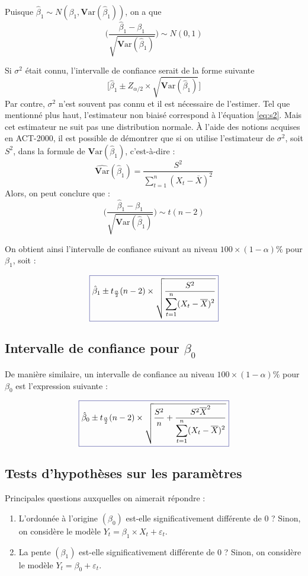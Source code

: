 \documentclass[11pt,french]{report}
\newcommand{\Var}{\mathrm{\textbf{V}ar}}
\begin{document}
\bigskip
Puisque $ \hat{\beta}_1 \sim N(\beta_1, \Var(\hat{\beta}_1))$, on a que 
$$
\Bigg(\frac{\hat{\beta}_1 - \beta_1}{\sqrt{\Var(\hat{\beta}_1)}}\Bigg) \sim N(0,1)
$$

Si $\sigma^2$ était connu, l'intervalle de confiance serait de la forme suivante 
$$
\bigg[\hat{\beta}_1\pm Z_{\alpha/2} \times \sqrt{\Var(\hat{\beta}_1)}\bigg]
$$
Par contre, $\sigma^2$ n'est  souvent pas connu et il est nécessaire de l'estimer. Tel que mentionné plus haut, l'estimateur non biaisé correspond à l'équation \ref{eq:s2}. Mais cet estimateur ne suit pas une distribution normale. À l'aide des notions acquises en ACT-2000, il est possible de démontrer que si on utilise l'estimateur de $\sigma^2$, soit $S^2$, dans la formule de $\Var(\hat{\beta}_1)$, c'est-à-dire :
$$
\widehat{\Var}(\hat{\beta}_1) = \frac{S^2}{\displaystyle\sum_{t=1}^n (X_t - \overline{X})^2}
$$
Alors, on peut conclure que :
$$
\Bigg(\frac{\hat{\beta}_1 - \beta_1}{\sqrt{\Var(\hat{\beta}_1)}}\Bigg) \sim t(n-2)
$$

On obtient ainsi l'intervalle de confiance suivant au niveau $100 \times (1 - \alpha)\%$ pour $\beta_1$, soit :

\begin{equation}
\label{eq:intconfb1}
\color{Blue}
\boxed{\color{black}
\hat{\beta}_1 \pm t_{\frac{\alpha}{2}}(n-2) \times \sqrt{\frac{S^2}{\displaystyle\sum_{t=1}^n (X_t - \overline{X})^2}}}
\end{equation}

\subsection{Intervalle de confiance pour $\beta_0$}
De manière similaire, un intervalle de confiance au niveau $100 \times (1 - \alpha)\%$ pour $\beta_0$ est l'expression suivante :

\begin{equation}
\label{eq:intconfb0}
\color{Blue}
\boxed{\color{black}
\hat{\beta}_0 \pm t_{\frac{\alpha}{2}}(n-2) \times \sqrt{\frac{S^2}{n} + \frac{S^2\overline{X}^2}{\displaystyle\sum_{t=1}^n (X_t - \overline{X})^2}}}
\end{equation}

\subsection{Tests d'hypothèses sur les paramètres}
Principales questions auxquelles on aimerait répondre :
\begin{enumerate}
\item \label{hyp1} L'ordonnée à l'origine $(\beta_0)$ est-elle significativement différente de 0 ? \newline
Sinon, on considère le modèle $Y_t = \beta_1\times X_t + \varepsilon_t$.
\item  \label{hyp2} La pente $(\beta_1)$ est-elle significativement différente de 0 ? \newline
Sinon, on considère le modèle $Y_t = \beta_0 + \varepsilon_t$.
\end{enumerate}
\end{document}
